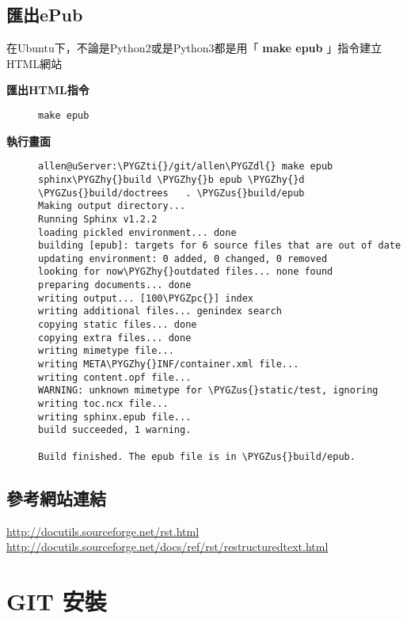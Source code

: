 \documentclass[letterpaper,10pt,english]{sphinxmanual}
\def\PYGZus{\char`\_}
\def\PYGZpc{\char`\%}
\def\PYGZdl{\char`\$}
\def\PYGZhy{\char`\-}
\def\PYGZti{\char`\~}
\begin{document}
\section{匯出ePub}
\label{_doc/sphinx-doc/index:epub}
在Ubuntu下，不論是Python2或是Python3都是用「 \textbf{make epub} 」指令建立HTML網站
\begin{description}
\item[{\textbf{匯出HTML指令}}] \leavevmode
\begin{Verbatim}[commandchars=\\\{\}]
make epub
\end{Verbatim}

\item[{\textbf{執行畫面}}] \leavevmode
\begin{Verbatim}[commandchars=\\\{\}]
allen@uServer:\PYGZti{}/git/allen\PYGZdl{} make epub
sphinx\PYGZhy{}build \PYGZhy{}b epub \PYGZhy{}d \PYGZus{}build/doctrees   . \PYGZus{}build/epub
Making output directory...
Running Sphinx v1.2.2
loading pickled environment... done
building [epub]: targets for 6 source files that are out of date
updating environment: 0 added, 0 changed, 0 removed
looking for now\PYGZhy{}outdated files... none found
preparing documents... done
writing output... [100\PYGZpc{}] index
writing additional files... genindex search
copying static files... done
copying extra files... done
writing mimetype file...
writing META\PYGZhy{}INF/container.xml file...
writing content.opf file...
WARNING: unknown mimetype for \PYGZus{}static/test, ignoring
writing toc.ncx file...
writing sphinx.epub file...
build succeeded, 1 warning.

Build finished. The epub file is in \PYGZus{}build/epub.
\end{Verbatim}

\end{description}


\section{參考網站連結}
\label{_doc/sphinx-doc/index:id6}
\href{http://docutils.sourceforge.net/rst.html}{http://docutils.sourceforge.net/rst.html}
\href{http://docutils.sourceforge.net/docs/ref/rst/restructuredtext.html}{http://docutils.sourceforge.net/docs/ref/rst/restructuredtext.html}


\chapter{GIT 安裝}
\label{_doc/git/index:git}\label{_doc/git/index::doc}
\end{document}
